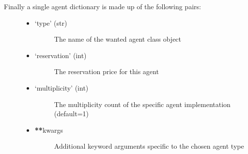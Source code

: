 \documentclass[letterpaper,10pt,english]{sphinxmanual}
\begin{document}
\sphinxAtStartPar
Finally a single agent dictionary is made up of the following  pairs:
\begin{description}
\item[{}] \leavevmode\begin{itemize}
\item {} \begin{description}
\item[{‘type’ (str)}] \leavevmode
\sphinxAtStartPar
The name of the wanted agent class object

\end{description}

\item {} \begin{description}
\item[{‘reservation’ (int)}] \leavevmode
\sphinxAtStartPar
The reservation price for this agent

\end{description}

\end{itemize}

\item[{}] \leavevmode\begin{itemize}
\item {} \begin{description}
\item[{‘multiplicity’ (int)}] \leavevmode
\sphinxAtStartPar
The multiplicity count of the specific agent implementation (default=1)

\end{description}

\item {} \begin{description}
\item[{{\color{red}\bfseries{}**}kwargs}] \leavevmode
\sphinxAtStartPar
Additional keyword arguments specific to the chosen agent type

\end{description}

\end{itemize}

\end{description}

\sphinxAtStartPar
{}
\end{document}
